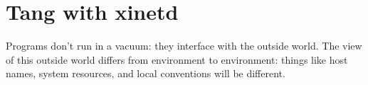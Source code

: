 \chapter{Tang with xinetd}\label{tangservice}

Programs don’t run in a vacuum: they interface with the outside world. The view of this outside
world differs from environment to environment: things like host names, system resources, and
local conventions will be different. 
